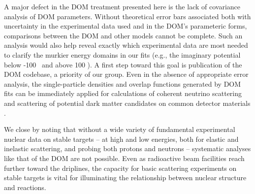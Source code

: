 A major defect in the DOM treatment presented here is
the lack of covariance analysis of DOM parameters. Without theoretical error
bars associated both with uncertainty in the experimental data used and in the
DOM's parameteric forms, comparisons between the DOM and other models cannot be
complete. Such an analysis would also help reveal exactly which experimental
data are most needed to clarify the murkier energy domains in our fits (e.g.,
the imaginary potential below -100 \mega\electronvolt\ and above 100
\mega\electronvolt). A first step toward this goal is publication of the DOM codebase, a
priority of our group. Even in the absence of appropriate error analysis, 
the single-particle densities and overlap functions generated by DOM fits can be
immediately applied for calculations of coherent neutrino scattering \cite{Herraiz2009} and
scattering of potential dark matter candidates on common detector materials \cite{Anand2014}.

We close by noting that without a wide variety of fundamental experimental nuclear data on stable
targets -- at high and low energies, both for elastic and inelastic scattering,
and probing both protons and neutrons -- systematic analyses like that of the DOM are not possible.
Even as radioactive beam facilities reach further toward the driplines, the capacity for basic 
scattering experiments on stable targets is vital for illuminating the relationship between nuclear 
structure and reactions.
